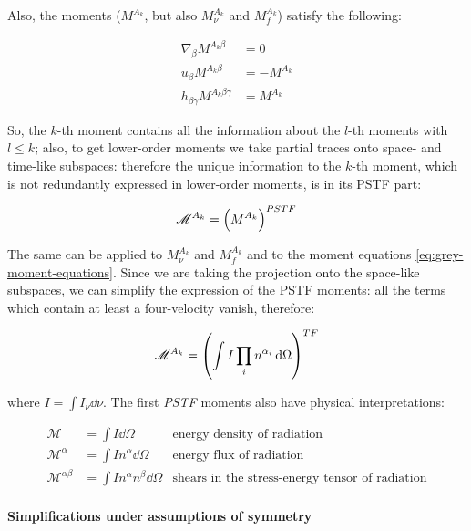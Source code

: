 \documentclass[main.tex]{subfiles}
\begin{document}
Also, the moments (\(M^{A_k}\), but also \(M^{A_k}_\nu\) and \(M^{A_k}_f\)) satisfy the following:

\begin{subequations}
\begin{align}
  \nabla_\beta M^{A_k \beta} &= 0 \\
  u_\beta M^{A_k \beta} &= -M^{A_k} \\
  h_{\beta \gamma} M^{A_k \beta \gamma} &= M^{A_k}
\end{align}
\end{subequations}

So, the \(k\)-th moment contains all the information about the \(l\)-th moments with \(l\leq k\); also, to get lower-order moments we take partial traces onto space- and time-like subspaces: therefore the unique information to the \(k\)-th moment, which is not redundantly expressed in lower-order moments, is in its PSTF part:

\begin{equation}
  \mathscr M ^{A_k} = \qty(M^{A_k}) ^{PSTF}
\end{equation}

The same can be applied to \(M^{A_k}_\nu\) and \(M^{A_k}_f\) and to the moment equations \eqref{eq:grey-moment-equations}. Since we are taking the projection onto the space-like subspaces, we can simplify the expression of the PSTF moments: all the terms which contain at least a four-velocity vanish, therefore:

\begin{equation} \label{eq:trace-free-moments-definition}
  \mathscr M^{A_k} = \qty(\int I \prod_i n^{\alpha_i} \dd{\Omega})^{TF}
\end{equation}

where \(I = \int I_\nu \dd{\nu}\).
The first \emph{PSTF} moments also have physical interpretations:

\begin{subequations}
\begin{align}
   \mathscr M &= \int  I \dd{\Omega}    & \text{energy density of radiation}  \\
   \mathscr M^\alpha &= \int I n^\alpha\dd{\Omega}  & \text{energy flux of radiation}  \\
   \mathscr M^{\alpha\beta} &= \int I n^\alpha n^\beta \dd{\Omega}   & \text{shears in the stress-energy tensor of radiation}
\end{align}
\end{subequations}

\paragraph{Simplifications under assumptions of symmetry}
\end{document}
